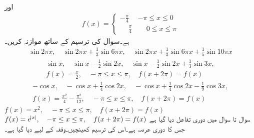 \quad {} اور
\begin{align*}
f(x)=
\begin{cases}
-\frac{\pi}{4}& -\pi \le x \le 0\\
\phantom{-}\frac{\pi}{4}&\phantom{-}0\le x \le \pi
\end{cases}
\end{align*}
ہے۔سوال  کی ترسیم کے ساتھ موازنہ کریں۔
\begin{align*}
\sin 2\pi x,\quad \sin 2\pi x+\frac{1}{3}\sin 6\pi x,\quad \sin 2\pi x+\frac{1}{3}\sin 6\pi x+\frac{1}{5}\sin 10\pi x
\end{align*}
\begin{align*}
\sin x,\quad \sin x-\frac{1}{2}\sin 2x,\quad \sin x-\frac{1}{2}\sin 2x+\frac{1}{3}\sin 3x,\\
f(x)=\frac{x}{2}, \quad  -\pi \le x \le \pi, \quad f(x+2\pi)=f(x)
\end{align*}
\begin{align*}
-\cos x,\quad -\cos x+\frac{1}{4}\cos 2x,\quad -\cos x+\frac{1}{4}\cos 2x-\frac{1}{9}\cos 3x,\\
f(x)=\frac{x^2}{4}-\frac{\pi^2}{12}, \quad  -\pi \le x \le \pi, \quad f(x+2\pi)=f(x)
\end{align*}
\quad 
$f(x)=x^2,\quad -\pi \le x \le \pi, \quad f(x+2\pi)=f(x)$
\quad 
$f(x)=e^{\abs{x}},\quad -\pi \le x \le \pi, \quad f(x+2\pi)=f(x)$
سوال  تا سوال  میں دوری تفاعل  دیا گیا ہے جس کا دوری عرصہ  ہے۔اس کی ترسیم کھینچیں۔وقفہ  کے لیے  دیا گیا ہے۔

